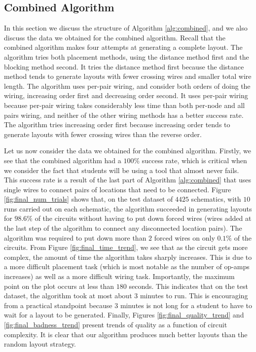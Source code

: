 \subsection{Combined Algorithm}
\label{sec:method_combination}

In this section we discuss the structure of Algorithm
\ref{alg:combined}, and we also
discuss the data we obtained for the combined algorithm. Recall that the combined
algorithm makes four attempts at generating a complete layout. The algorithm
tries both
placement methods, using the distance method first and the blocking method
second. It
tries the distance method first because the distance method tends to
generate layouts with fewer
crossing wires and smaller total wire length. The algorithm uses
per-pair wiring, and
consider both orders of doing the wiring, increasing order first and decreasing
order second. It uses per-pair wiring because per-pair wiring takes considerably
less time than both per-node and all pairs wiring, and neither of the other
wiring methods has a better success rate. The algorithm tries increasing order
first because increasing order tends to generate layouts with fewer crossing
wires than the reverse order.

Let us now consider the data we obtained for the combined algorithm. Firstly, we
see that the combined algorithm had a $100\%$ success rate, which is critical
when we consider the fact that students will be using a tool that almost never
fails. This success rate is a result of the last part of Algorithm
\ref{alg:combined} that uses single wires to connect pairs of locations that
need to be connected.
Figure \ref{fig:final_num_trials} shows that, on the test dataset of $4425$
schematics, with $10$ runs carried out on each schematic, the algorithm succeeded
in generating layouts for $98.6\%$ of the circuits without having to put down
forced wires (wires added at the last step of the algorithm to connect any
disconnected location pairs). The algorithm was
required to put down more than $2$ forced wires on only $0.1\%$ of the circuits.
From Figure
\ref{fig:final_time_trend}, we see that as the circuit gets more complex, the
amount of time the algorithm takes sharply increases. This is due to a more
difficult placement task (which is most notable as the number of op-amps
increases) as well as a more
difficult wiring task. Importantly, the maximum
point on the plot occurs at less than $180$ seconds. This indicates that on the
test dataset, the algorithm took at most about $3$ minutes to run. This is
encouraging from a practical standpoint because $3$ minutes is not long
for a student to have to wait for a layout to be generated.
Finally, Figures \ref{fig:final_quality_trend} and \ref{fig:final_badness_trend}
present trends of quality as a
function of circuit complexity. It is clear that our algorithm produces
much better layouts than the random layout strategy.

